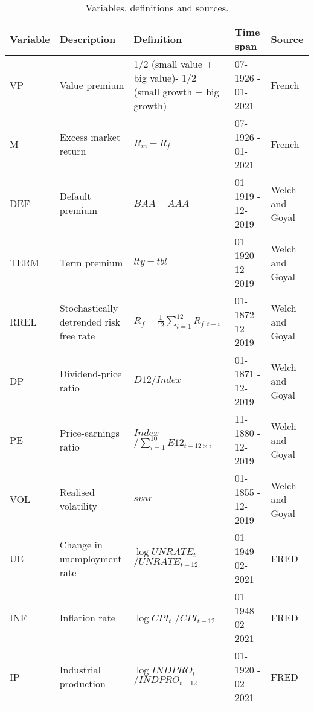 \begin{table}[htbp]
    \centering
    \begin{tabular}{@{}lp{3cm}p{3cm}ll@{}}
         \hline Variable & Description & Definition & Time span & Source   \\\hline
         VP & Value premium & 1/2 (small value + big value)- 1/2 (small growth + big growth) & 07-1926 - 01-2021& French \\
         M & Excess market return & $R_m-R_f$ & 07-1926 - 01-2021 & French\\
         DEF & Default premium & $BAA - AAA$ & 01-1919 -  12-2019& Welch and Goyal\\
         TERM & Term premium & $lty-tbl$ & 01-1920 - 12-2019 & Welch and Goyal\\
         RREL & Stochastically detrended risk free rate & $R_f-\frac{1}{12}\sum^{12}_{i=1}R_{f,t-i}$ & 01-1872 - 12-2019  & Welch and Goyal\\
         DP & Dividend-price ratio & $D12/Index$ & 01-1871 - 12-2019 & Welch and Goyal\\
         PE & Price-earnings ratio & $Index$ $/\sum^{10}_{i=1}E12_{t-12\times i}$ & 11-1880 - 12-2019 & Welch and Goyal \\
         VOL & Realised volatility & $svar$ & 01-1855 - 12-2019& Welch and Goyal \\
         UE & Change in unemployment rate & $\log UNRATE_t $ $/ UNRATE_{t-12}$ & 01-1949 - 02-2021  & FRED \\
         INF & Inflation rate & $\log CPI_t $ $/ CPI_{t-12}$ & 01-1948 - 02-2021  & FRED\\
         IP & Industrial production & $\log INDPRO_t$ $/ INDPRO_{t-12}$ & 01-1920 - 02-2021& FRED \\\hline
    \end{tabular}
    \caption{Variables, definitions and sources.}
    \label{tab:data}
\end{table}